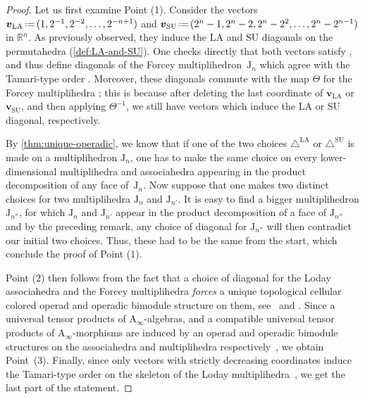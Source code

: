 \documentclass{amsart}
\theoremstyle{definition}
\newcommand{\R}{\mathbb{R}} %
\renewcommand{\b}[1]{{\boldsymbol{#1}}} %
\newcommand{\J}{\mathrm{J}} %
\newcommand{\eqdef}{\mbox{\,\raisebox{0.2ex}{\scriptsize\ensuremath{\mathrm:}}\ensuremath{=}\,}} %
\renewcommand{\b}[1]{\boldsymbol{#1}} %
\newcommand{\SU}{\mathrm{SU}}
\newcommand{\LA}{\mathrm{LA}}
\newcommand{\SUD}{\triangle^{\mathrm{SU}}}
\newcommand{\LAD}{\triangle^{\mathrm{LA}}}
\newcommand{\Ainf}{\ensuremath{\mathrm{A}_\infty}}
\begin{document}
\begin{proof}
Let us first examine Point (1).
Consider the vectors $\b{v}_\LA \eqdef (1,2^{-1},2^{-2},\ldots,2^{-n+1})$ and $\b{v}_\SU \eqdef (2^n-1,2^{n}-2,2^n-2^2,\ldots,2^n-2^{n-1})$ in $\R^n$.
As previously observed, they induce the $\LA$ and $\SU$ diagonals on the permutahedra (\cref{def:LA-and-SU}).
One checks directly that both vectors satisfy \cite[Prop. 2.7 \& 2.8]{LaplanteAnfossiMazuir}, and thus define diagonals of the Forcey multiplihedron~$\J_n$ which agree with the Tamari-type order \cite[Prop. 2.10]{LaplanteAnfossiMazuir}.
Moreover, these diagonals commute with the map $\Theta$ for the Forcey multiplihedra \cite[Prop. 2.14]{LaplanteAnfossiMazuir}; this is because after deleting the last coordinate of $\b{v}_\LA$ or $\b{v}_\SU$, and then applying $\Theta^{-1}$, we still have vectors which induce the $\LA$ or $\SU$ diagonal, respectively. 

By \cref{thm:unique-operadic}, we know that if one of the two choices $\LAD$ or $\SUD$ is made on a multiplihedron $\J_n$, one has to make the same choice on every lower-dimensional multiplihedra and associahedra appearing in the product decomposition of any face of~$\J_n$. 
Now suppose that one makes two distinct choices for two multiplihedra $\J_n$ and $\J_{n'}$.
It is easy to find a bigger multiplihedron $\J_{n''}$, for which $\J_n$ and $\J_{n'}$ appear in the product decomposition of a face of $\J_{n''}$ and by the preceding remark, any choice of diagonal for $\J_{n''}$ will then contradict our initial two choices. 
Thus, these had to be the same from the start, which conclude the proof of Point (1). 

Point (2) then follows from the fact that a choice of diagonal for the Loday associahedra and the Forcey multiplihedra \emph{forces} a unique topological cellular colored operad and operadic bimodule structure on them, see~\cite[Thm.~1]{MasudaThomasTonksVallette} and \cite[Thm.~1]{LaplanteAnfossiMazuir}.
Since a universal tensor products of $\Ainf$-algebras, and a compatible universal tensor products of $\Ainf$-morphisms are induced by an operad and operadic bimodule structures on the associahedra and multiplihedra respectively~\cite[Sec.~4.2.3]{LaplanteAnfossiMazuir}, we obtain Point~(3).
Finally, since only vectors with strictly decreasing coordinates induce the Tamari-type order on the skeleton of the Loday multiplihedra~\cite[Prop. 2.10]{LaplanteAnfossiMazuir}, we get the last part of the statement. 
\end{proof}
\end{document}
